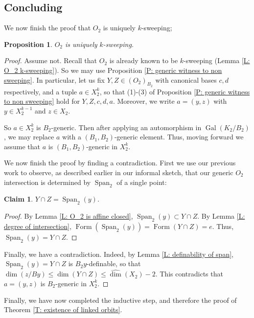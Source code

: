 \documentclass{amsart}
\newtheorem{claim}[theorem]{Claim}
\newtheorem{proposition}[theorem]{Proposition}
\theoremstyle{definition}
\begin{document}
    \subsection{Concluding}

    We now finish the proof that $O_2$ is uniquely $k$-sweeping;
    
    \begin{proposition}
        $O_2$ is uniquely $k$-sweeping.
    \end{proposition}
    \begin{proof}
    Assume not. Recall that $O_2$ is already known to be $k$-sweeping (Lemma \ref{L: O_2 k-sweeping}). So we may use Proposition \ref{P: generic witness to non sweeping}. In particular, let us fix $Y,Z\in(O_2)_{B_2}$ with canonical bases $c,d$ respectively, and a tuple $a\in X_2^k$, so that (1)-(3) of Proposition \ref{P: generic witness to non sweeping} hold for $Y,Z,c,d,a$. Moreover, we write $a=(y,z)$ with $y\in X_2^{k-1}$ and $z\in X_2$.

    So $a\in X_2^k$ is $B_2$-generic. Then after applying an automorphism in $\operatorname{Gal}(K_2/B_2)$, we may replace $a$ with a $(B_1,B_2)$-generic element. Thus, moving forward we assume that $a$ is $(B_1,B_2)$-generic in $X_2^k$.

    We now finish the proof by finding a contradiction. First we use our previous work to observe, as described earlier in our informal sketch, that our generic $O_2$ intersection is determined by $\operatorname{Span}_2$ of a single point:

    \begin{claim}\label{Cl: intersection is span of point}
        $Y\cap Z=\operatorname{Span}_2(y)$.
    \end{claim}
    \begin{proof}
        By Lemma \ref{L: O_2 is affine closed}, $\operatorname{Span}_2(y)\subset Y\cap Z$. By Lemma \ref{L: degree of intersection}, $\operatorname{Form}(\operatorname{Span}_2(y))=\operatorname{Form}(Y\cap Z)=e$. Thus, $\operatorname{Span}_2(y)=Y\cap Z$.
    \end{proof}

    Finally, we have a contradiction. Indeed, by Lemma \ref{L: definability of span}, $\operatorname{Span}_2(y)=Y\cap Z$ is $B_2y$-definable, so that $\dim(z/By)\leq\dim(Y\cap Z)\leq\hat\dim(X_2)-2$. This contradicts that $a=(y,z)$ is $B_2$-generic in $X_2^k$.
    \end{proof}

    Finally, we have now completed the inductive step, and therefore the proof of Theorem \ref{T: existence of linked orbits}.
\end{document}
